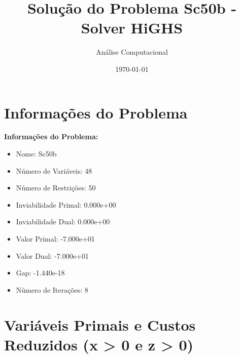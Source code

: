 \documentclass[12pt]{article}
\title{Solução do Problema Sc50b - Solver HiGHS}
\author{Análise Computacional}
\date{\today}
\begin{document}
\maketitle

\section{Informações do Problema}

\textbf{Informações do Problema:}
\begin{itemize}
\item Nome: Sc50b
\item Número de Variáveis: 48
\item Número de Restrições: 50
\item Inviabilidade Primal: 0.000e+00
\item Inviabilidade Dual: 0.000e+00
\item Valor Primal: -7.000e+01
\item Valor Dual: -7.000e+01
\item Gap: -1.440e-18
\item Número de Iterações: 8
\end{itemize}


\section{Variáveis Primais e Custos Reduzidos (x > 0 e z > 0)}
\end{document}
